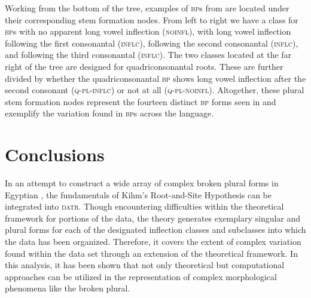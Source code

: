 \documentclass[output=paper,modfonts]{langscibook}
\begin{document}
Working from the bottom of the tree, examples of \textsc{bp}s from  are located under their corresponding stem formation nodes. From left to right we have a class for \textsc{bp}s with no apparent long vowel inflection (\textsc{noinfl}), with long vowel inflection following the first consonantal  (\textsc{inflc}), following the second consonantal  (\textsc{inflc}), and following the third consonantal  (\textsc{inflc}). The two classes located at the far right of the tree are designed for quadriconsonantal roots. These are further divided by whether the quadriconsonantal \textsc{bp} shows long vowel inflection after the second  consonant (\textsc{q-pl-inflc}) or not at all (\textsc{q-pl-noinfl}). Altogether, these plural stem formation nodes represent the fourteen distinct \textsc{bp} forms seen in  and exemplify the variation found in \textsc{bp}s across the language.

\section{Conclusions}

In an attempt to construct a wide array of complex broken plural forms in Egyptian , the fundamentals of Kihm's Root-and-Site Hypothesis can be integrated into \textsc{datr}. Though encountering difficulties within the theoretical framework for portions of the data, the theory generates exemplary singular and plural forms for each of the designated inflection classes and subclasses into which the data has been organized. Therefore, it covers the extent of complex variation found within the data set through an extension of the theoretical framework. In this analysis, it has been shown that not only theoretical but computational approaches can be utilized in the representation of complex morphological phenomena like the broken plural.  
 

{\sloppy
\printbibliography[heading=subbibliography,notkeyword=this]
}
\end{document}
